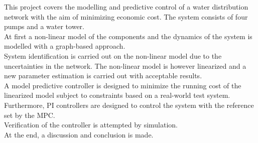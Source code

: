 


This project covers the modelling and predictive control of a water distribution network with the aim of minimizing economic cost. The system consists of four pumps and a water tower.\\
At first a non-linear model of the components and the dynamics of the system is modelled with a graph-based approach.\\ 
System identification is carried out on the non-linear model due to the uncertainties in the network. The non-linear model is however linearized and a new parameter estimation is carried out with acceptable results. \\
A model predictive controller is designed to minimize the running cost of the linearized model subject to constraints based on a real-world test system. Furthermore, PI controllers are designed to control the system with the reference set by the MPC. \\
Verification of the controller is attempted by simulation.\\
At the end, a discussion and conclusion is made. 






